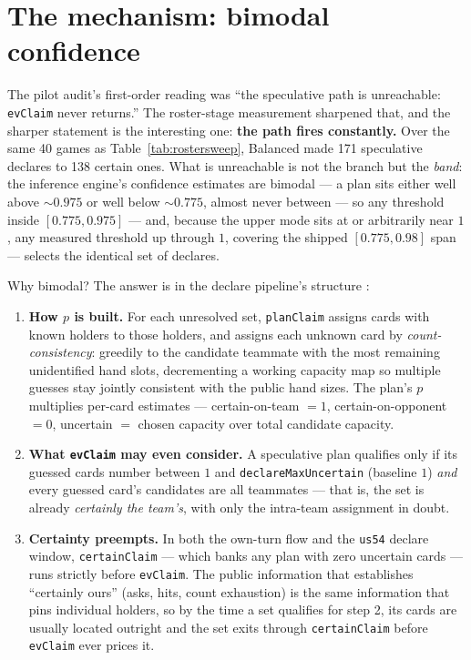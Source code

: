 \documentclass[11pt]{article}
\newcommand{\code}[1]{\texttt{#1}}
\begin{document}
\section{The mechanism: bimodal confidence}
\label{sec:mechanism}

The pilot audit's first-order reading was ``the speculative path is unreachable: \code{evClaim}
never returns.'' The roster-stage measurement sharpened that, and the sharper statement is the
interesting one: \textbf{the path fires constantly.} Over the same 40 games as
Table~\ref{tab:rostersweep}, Balanced made 171 speculative declares to 138 certain ones. What is
unreachable is not the branch but the \emph{band}: the inference engine's confidence estimates
are bimodal --- a plan sits either well above ${\sim}0.975$ or well below ${\sim}0.775$, almost
never between --- so any threshold inside $[0.775, 0.975]$ --- and, because the upper mode sits
at or arbitrarily near $1$, any measured threshold up through $1$, covering the shipped
$[0.775, 0.98]$ span --- selects the identical set of declares.

Why bimodal? The answer is in the declare pipeline's structure \cite{decide}:

\begin{enumerate}
  \item \textbf{How $p$ is built.} For each unresolved set, \code{planClaim} assigns cards with
  known holders to those holders, and assigns each unknown card by \emph{count-consistency}:
  greedily to the candidate teammate with the most remaining unidentified hand slots,
  decrementing a working capacity map so multiple guesses stay jointly consistent with the
  public hand sizes. The plan's $p$ multiplies per-card estimates --- certain-on-team $=1$,
  certain-on-opponent $=0$, uncertain $=$ chosen capacity over total candidate capacity.
  \item \textbf{What \code{evClaim} may even consider.} A speculative plan qualifies only if its
  guessed cards number between $1$ and \code{declareMaxUncertain} (baseline $1$) \emph{and}
  every guessed card's candidates are all teammates --- that is, the set is already
  \emph{certainly the team's}, with only the intra-team assignment in doubt.
  \item \textbf{Certainty preempts.} In both the own-turn flow and the \code{us54} declare
  window, \code{certainClaim} --- which banks any plan with zero uncertain cards --- runs strictly
  before \code{evClaim}. The public information that establishes ``certainly ours'' (asks, hits,
  count exhaustion) is the same information that pins individual holders, so by the time a set
  qualifies for step 2, its cards are usually located outright and the set exits through
  \code{certainClaim} before \code{evClaim} ever prices it.
\end{enumerate}
\end{document}
